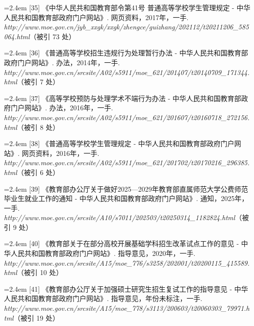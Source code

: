 {\vspace{0.6pt}
\noindent\hangindent=2.4em \label{src:S0040}{\color{cAccent}[35]} 《中华人民共和国教育部令第41号 普通高等学校学生管理规定 - 中华人民共和国教育部政府门户网站》. 网页资料，2017年，一手. \textit{http://www.moe.gov.cn/jyb\_xxgk/xxgk/zhengce/guizhang/202112/t20211206\_585064.html}（被引 73 处）\par
\vspace{0.6pt}
\noindent\hangindent=2.4em \label{src:S0041}{\color{cAccent}[36]} 《普通高等学校招生违规行为处理暂行办法 - 中华人民共和国教育部政府门户网站》. 办法，2014年，一手. \textit{http://www.moe.gov.cn/srcsite/A02/s5911/moe\_621/201407/t20140709\_171344.html}（被引 7 处）\par
\vspace{0.6pt}
\noindent\hangindent=2.4em \label{src:S0042}{\color{cAccent}[37]} 《高等学校预防与处理学术不端行为办法 - 中华人民共和国教育部政府门户网站》. 办法，2016年，一手. \textit{http://www.moe.gov.cn/srcsite/A02/s5911/moe\_621/201607/t20160718\_272156.html}（被引 8 处）\par
\vspace{0.6pt}
\noindent\hangindent=2.4em \label{src:S0043}{\color{cAccent}[38]} 《普通高等学校学生管理规定 - 中华人民共和国教育部政府门户网站》. 网页资料，2016年，一手. \textit{http://www.moe.gov.cn/srcsite/A02/s5911/moe\_621/201702/t20170216\_296385.html}（被引 6 处）\par
\vspace{0.6pt}
\noindent\hangindent=2.4em \label{src:S0044}{\color{cAccent}[39]} 《教育部办公厅关于做好2025—2029年教育部直属师范大学公费师范毕业生就业工作的通知 - 中华人民共和国教育部政府门户网站》. 通知，2025年，一手. \textit{http://www.moe.gov.cn/srcsite/A10/s7011/202503/t20250314\_1182824.html}（被引 9 处）\par
\vspace{0.6pt}
\noindent\hangindent=2.4em \label{src:S0045}{\color{cAccent}[40]} 《教育部关于在部分高校开展基础学科招生改革试点工作的意见 - 中华人民共和国教育部政府门户网站》. 指导意见，2020年，一手. \textit{http://www.moe.gov.cn/srcsite/A15/moe\_776/s3258/202001/t20200115\_415589.html}（被引 10 处）\par
\vspace{0.6pt}
\noindent\hangindent=2.4em \label{src:S0046}{\color{cAccent}[41]} 《教育部办公厅关于加强硕士研究生招生复试工作的指导意见 - 中华人民共和国教育部政府门户网站》. 指导意见，年份未标注，一手. \textit{http://www.moe.gov.cn/srcsite/A15/moe\_778/s3113/200603/t20060303\_79971.html}（被引 19 处）\par
}
